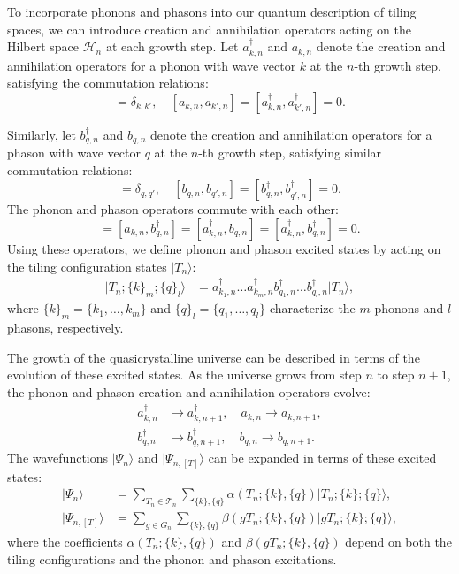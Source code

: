 \documentclass[sn-mathphys-num]{sn-jnl}%
\begin{document}
To incorporate phonons and phasons into our quantum description of tiling spaces, we can introduce creation and annihilation operators acting on the Hilbert space $\mathcal{H}_n$ at each growth step. Let $a^{\dagger}_{k,n}$ and $a_{k,n}$ denote the creation and annihilation operators for a phonon with wave vector $k$ at the $n$-th growth step, satisfying the commutation relations:
\begin{equation}
[a_{k,n}, a^{\dagger}_{k',n}] = \delta_{k,k'}, \quad [a_{k,n}, a_{k',n}] = [a^{\dagger}_{k,n}, a^{\dagger}_{k',n}] = 0.
\end{equation}

Similarly, let $b^{\dagger}_{q,n}$ and $b_{q,n}$ denote the creation and annihilation operators for a phason with wave vector $q$ at the $n$-th growth step, satisfying similar commutation relations:
\begin{equation}
[b_{q,n}, b^{\dagger}_{q',n}] = \delta_{q,q'}, \quad [b_{q,n}, b_{q',n}] = [b^{\dagger}_{q,n}, b^{\dagger}_{q',n}] = 0.
\end{equation}
The phonon and phason operators commute with each other:
\begin{equation}
[a_{k,n}, b_{q,n}] = [a_{k,n}, b^{\dagger}_{q,n}] = [a^{\dagger}_{k,n}, b_{q,n}] = [a^{\dagger}_{k,n}, b^{\dagger}_{q,n}] = 0.
\end{equation}
Using these operators, we define phonon and phason excited states by acting on the tiling configuration states $|T_n\rangle$:
\begin{align}
|T_n; \{k\}_m; \{q\}_l\rangle &= a^{\dagger}_{k_1,n} \ldots a^{\dagger}_{k_m,n} b^{\dagger}_{q_1,n} \ldots b^{\dagger}_{q_l,n} |T_n\rangle,
\end{align}
where $\{k\}_m = \{k_1, \ldots, k_m\}$ and $\{q\}_l = \{q_1, \ldots, q_l\}$ characterize the $m$ phonons and $l$ phasons, respectively.

The growth of the quasicrystalline universe can be described in terms of the evolution of these excited states. As the universe grows from step $n$ to step $n+1$, the phonon and phason creation and annihilation operators evolve:
\begin{align}
a^{\dagger}_{k,n} &\rightarrow a^{\dagger}_{k,n+1}, \quad a_{k,n} \rightarrow a_{k,n+1}, \\
b^{\dagger}_{q,n} &\rightarrow b^{\dagger}_{q,n+1}, \quad b_{q,n} \rightarrow b_{q,n+1}.
\end{align}
The wavefunctions $|\Psi_n\rangle$ and $|\Psi_{n,[T]}\rangle$ can be expanded in terms of these excited states:
\begin{align}
|\Psi_n\rangle &= \sum_{T_n \in \mathcal{T}_n} \sum_{\{k\}, \{q\}} \alpha(T_n; \{k\}, \{q\}) |T_n; \{k\}; \{q\}\rangle, \\
|\Psi_{n,[T]}\rangle &= \sum_{g \in G_n} \sum_{\{k\}, \{q\}} \beta(g T_n; \{k\}, \{q\}) |g T_n; \{k\}; \{q\}\rangle,
\end{align}
where the coefficients $\alpha(T_n; \{k\}, \{q\})$ and $\beta(g T_n; \{k\}, \{q\})$ depend on both the tiling configurations and the phonon and phason excitations.
\end{document}
